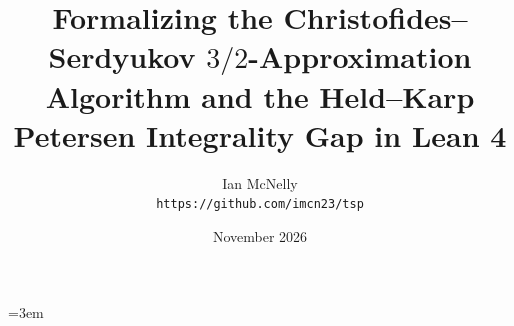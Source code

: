 \documentclass[11pt,a4paper]{article}
\title{\textbf{Formalizing the Christofides--Serdyukov $3/2$-Approximation Algorithm and the Held--Karp Petersen Integrality Gap in Lean 4}}
\author{Ian McNelly \\ \small\texttt{https://github.com/imcn23/tsp}}
\date{November 2026}
\theoremstyle{definition}
\theoremstyle{remark}
\renewcommand{\_}{\origunderscore\allowbreak}
\begin{document}
\emergencystretch=3em
\maketitle


\end{document}
